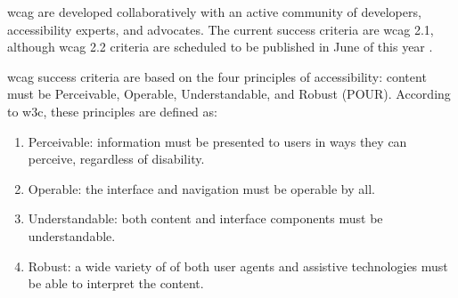 \documentclass{article}
\begin{document}
\acrshort{wcag} are developed collaboratively with an active community of developers, accessibility experts, and advocates. The current success criteria are \acrshort{wcag} 2.1, although \acrshort{wcag} 2.2 criteria are scheduled to be published in June of this year \cite{wai_develop}.
\vspace{2em}

\vspace{2em}

\acrshort{wcag} success criteria are based on the four principles of accessibility: content must be Perceivable, Operable, Understandable, and Robust (POUR). According to \acrshort{w3c}, these principles are defined as: 

\begin{enumerate}
    \item Perceivable: information must be presented to users in ways they can perceive, regardless of disability.
    \item Operable: the interface and navigation must be operable by all.
    \item Understandable: both content and interface components must be understandable.
    \item Robust: a wide variety of of both user agents and assistive technologies must be able to interpret the content. \cite{wcag}
\end{enumerate}
\end{document}
